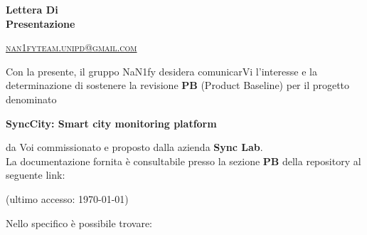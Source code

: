 \documentclass[8pt]{article}
\begin{document}
\begin{titlepage}
\begin{minipage}[t]{0.47\textwidth}
{		}
		\vspace{4mm}\vspace{4mm}
	\end{minipage}
	\vspace{4cm}
	\begin{center}
		\begin{flushright}
			{\fontsize{30pt}{52pt}\selectfont \textbf{Lettera Di \\Presentazione\\}} %
		\end{flushright}
		\vspace{3cm}
	\end{center}
	\vspace{8.5 cm}
	{\small \textsc{\href{mailto: nan1fyteam.unipd@gmail.com}{nan1fyteam.unipd@gmail.com}}}
\end{titlepage}
\pagestyle{mystyle}
\newpage
Con la presente, il gruppo NaN1fy desidera comunicarVi l'interesse e la determinazione di sostenere
la revisione \textbf{PB} (Product Baseline) per il
progetto denominato\\
\begin{center}
	\textbf{SyncCity: Smart city monitoring platform}
\end{center}
da Voi commissionato e proposto dalla azienda \textbf{Sync Lab}.
\vspace{1em}
\\La documentazione fornita è consultabile presso la sezione \textbf{PB} della repository al seguente link:
\begin{center}
	\textbf{\href{https://github.com/NaN1fy/docs/tree/main/documents/PB}{\color{myblue}{https://github.com/NaN1fy/docs/tree/main/documents/PB}}}
    (ultimo accesso: \today)
\end{center}
Nello specifico è possibile trovare:
\end{document}
